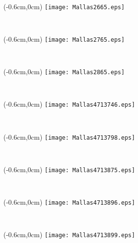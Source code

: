 \documentclass[12pt,letterpaper,oneside]{report}
\begin{document}
\ \pagebreak

\begin{textblock*}{\paperwidth}(-0.6cm,0cm)
\texttt{[image: Mallas2665.eps]}
\end{textblock*}

\ \pagebreak

\begin{textblock*}{\paperwidth}(-0.6cm,0cm)
\texttt{[image: Mallas2765.eps]}
\end{textblock*}

\ \pagebreak

\begin{textblock*}{\paperwidth}(-0.6cm,0cm)
\texttt{[image: Mallas2865.eps]}
\end{textblock*}

\ \pagebreak


\begin{textblock*}{\paperwidth}(-0.6cm,0cm)
\texttt{[image: Mallas4713746.eps]}
\end{textblock*}

\ \pagebreak

\begin{textblock*}{\paperwidth}(-0.6cm,0cm)
\texttt{[image: Mallas4713798.eps]}
\end{textblock*}

\ \pagebreak

\begin{textblock*}{\paperwidth}(-0.6cm,0cm)
\texttt{[image: Mallas4713875.eps]}
\end{textblock*}

\ \pagebreak

\begin{textblock*}{\paperwidth}(-0.6cm,0cm)
\texttt{[image: Mallas4713896.eps]}
\end{textblock*}

\ \pagebreak

\begin{textblock*}{\paperwidth}(-0.6cm,0cm)
\texttt{[image: Mallas4713899.eps]}
\end{textblock*}

\ \pagebreak
\end{document}
